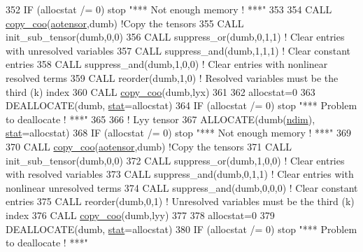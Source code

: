 \begin{DoxyCode}
352     \textcolor{keywordflow}{IF} (allocstat /= 0) stop \textcolor{stringliteral}{"*** Not enough memory ! ***"}
353 
354     \textcolor{keyword}{CALL }\hyperlink{namespacetensor_a14f95c256cdf137ca0767ddb3c87deea}{copy\_coo}(\hyperlink{namespaceaotensor__def_a0dc43bc9294a18f2fe57b67489f1702f}{aotensor},dumb) \textcolor{comment}{!Copy the tensors}
355     \textcolor{keyword}{CALL }init\_sub\_tensor(dumb,0,0)
356     \textcolor{keyword}{CALL }suppress\_or(dumb,0,1,1) \textcolor{comment}{! Clear entries with unresolved variables}
357     \textcolor{keyword}{CALL }suppress\_and(dumb,1,1,1) \textcolor{comment}{! Clear constant entries}
358     \textcolor{keyword}{CALL }suppress\_and(dumb,1,0,0) \textcolor{comment}{! Clear entries with nonlinear resolved terms}
359     \textcolor{keyword}{CALL }reorder(dumb,1,0) \textcolor{comment}{! Resolved variables must be the third (k) index}
360     \textcolor{keyword}{CALL }\hyperlink{namespacetensor_a14f95c256cdf137ca0767ddb3c87deea}{copy\_coo}(dumb,lyx)
361 
362     allocstat=0
363     \textcolor{keyword}{DEALLOCATE}(dumb, \hyperlink{namespacestat}{stat}=allocstat)
364     \textcolor{keywordflow}{IF} (allocstat /= 0)  stop \textcolor{stringliteral}{"*** Problem to deallocate ! ***"}
365 
366     \textcolor{comment}{! Lyy tensor}
367     \textcolor{keyword}{ALLOCATE}(dumb(\hyperlink{namespaceparams_a2323fe1773f086e20c14f266351c482b}{ndim}), \hyperlink{namespacestat}{stat}=allocstat)
368     \textcolor{keywordflow}{IF} (allocstat /= 0) stop \textcolor{stringliteral}{"*** Not enough memory ! ***"}
369 
370     \textcolor{keyword}{CALL }\hyperlink{namespacetensor_a14f95c256cdf137ca0767ddb3c87deea}{copy\_coo}(\hyperlink{namespaceaotensor__def_a0dc43bc9294a18f2fe57b67489f1702f}{aotensor},dumb) \textcolor{comment}{!Copy the tensors}
371     \textcolor{keyword}{CALL }init\_sub\_tensor(dumb,0,0)
372     \textcolor{keyword}{CALL }suppress\_or(dumb,1,0,0) \textcolor{comment}{! Clear entries with resolved variables}
373     \textcolor{keyword}{CALL }suppress\_and(dumb,0,1,1) \textcolor{comment}{! Clear entries with nonlinear unresolved terms}
374     \textcolor{keyword}{CALL }suppress\_and(dumb,0,0,0) \textcolor{comment}{! Clear constant entries}
375     \textcolor{keyword}{CALL }reorder(dumb,0,1) \textcolor{comment}{! Unresolved variables must be the third (k) index}
376     \textcolor{keyword}{CALL }\hyperlink{namespacetensor_a14f95c256cdf137ca0767ddb3c87deea}{copy\_coo}(dumb,lyy)
377 
378     allocstat=0
379     \textcolor{keyword}{DEALLOCATE}(dumb, \hyperlink{namespacestat}{stat}=allocstat)
380     \textcolor{keywordflow}{IF} (allocstat /= 0)  stop \textcolor{stringliteral}{"*** Problem to deallocate ! ***"}

\end{DoxyCode}
